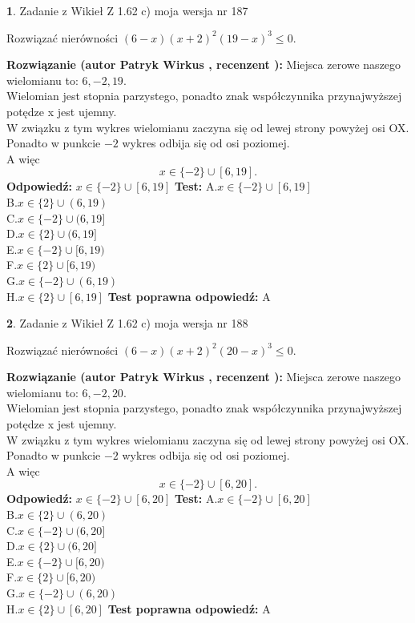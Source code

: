 \documentclass[12pt, a4paper]{article}
\theoremstyle{definition} %
\newtheorem{zad}{}
\newcommand{\zadStart}[1]{\begin{zad}#1\newline}
\newcommand{\zadStop}{\end{zad}}
\newcommand{\rozwStart}[2]{\noindent \textbf{Rozwiązanie (autor #1 , recenzent #2): }\newline}
\newcommand{\rozwStop}{\newline}
\newcommand{\odpStart}{\noindent \textbf{Odpowiedź:}\newline}
\newcommand{\odpStop}{\newline}
\newcommand{\testStart}{\noindent \textbf{Test:}\newline}
\newcommand{\testStop}{\newline}
\newcommand{\kluczStart}{\noindent \textbf{Test poprawna odpowiedź:}\newline}
\newcommand{\kluczStop}{\newline}
\begin{document}
\zadStart{Zadanie z Wikieł Z 1.62 c) moja wersja nr 187}

Rozwiązać nierówności $(6-x)(x+2)^{2}(19-x)^{3}\le0$.
\zadStop
\rozwStart{Patryk Wirkus}{}
Miejsca zerowe naszego wielomianu to: $6, -2, 19$.\\
Wielomian jest stopnia parzystego, ponadto znak współczynnika przy\linebreak najwyższej potędze x jest ujemny.\\ W związku z tym wykres wielomianu zaczyna się od lewej strony powyżej osi OX.\\
Ponadto w punkcie $-2$ wykres odbija się od osi poziomej.\\
A więc $$x \in \{-2\} \cup [6,19].$$
\rozwStop
\odpStart
$x \in \{-2\} \cup [6,19]$
\odpStop
\testStart
A.$x \in \{-2\} \cup [6,19]$\\
B.$x \in \{2\} \cup (6,19)$\\
C.$x \in \{-2\} \cup (6,19]$\\
D.$x \in \{2\} \cup (6,19]$\\
E.$x \in \{-2\} \cup [6,19)$\\
F.$x \in \{2\} \cup [6,19)$\\
G.$x \in \{-2\} \cup (6,19)$\\
H.$x \in \{2\} \cup [6,19]$
\testStop
\kluczStart
A
\kluczStop



\zadStart{Zadanie z Wikieł Z 1.62 c) moja wersja nr 188}

Rozwiązać nierówności $(6-x)(x+2)^{2}(20-x)^{3}\le0$.
\zadStop
\rozwStart{Patryk Wirkus}{}
Miejsca zerowe naszego wielomianu to: $6, -2, 20$.\\
Wielomian jest stopnia parzystego, ponadto znak współczynnika przy\linebreak najwyższej potędze x jest ujemny.\\ W związku z tym wykres wielomianu zaczyna się od lewej strony powyżej osi OX.\\
Ponadto w punkcie $-2$ wykres odbija się od osi poziomej.\\
A więc $$x \in \{-2\} \cup [6,20].$$
\rozwStop
\odpStart
$x \in \{-2\} \cup [6,20]$
\odpStop
\testStart
A.$x \in \{-2\} \cup [6,20]$\\
B.$x \in \{2\} \cup (6,20)$\\
C.$x \in \{-2\} \cup (6,20]$\\
D.$x \in \{2\} \cup (6,20]$\\
E.$x \in \{-2\} \cup [6,20)$\\
F.$x \in \{2\} \cup [6,20)$\\
G.$x \in \{-2\} \cup (6,20)$\\
H.$x \in \{2\} \cup [6,20]$
\testStop
\kluczStart
A
\kluczStop
\end{document}
